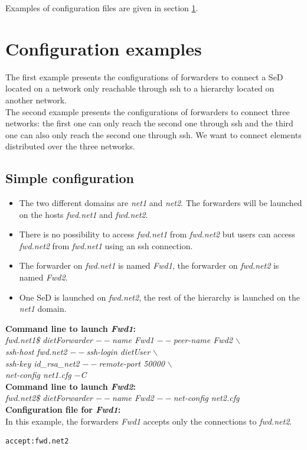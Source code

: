 Examples of configuration files are given in section
\ref{sec:ForwarderExamples}.


\section{Configuration examples}
\label{sec:ForwarderExamples}
The first example presents the configurations of \diet forwarders to
connect a SeD located on a network only reachable through ssh to a
\diet hierarchy located on another network.\\

The second example presents the configurations of \diet forwarders to
connect three networks: the first one can only reach the second one
through ssh and the third one can also only reach the second one
through ssh. We want to connect \diet elements distributed over the
three networks.
\subsection{Simple configuration}
\begin{itemize}
\item The two different domains are \textit{net1} and \textit{net2}. The forwarders will
  be launched on the hosts \textit{fwd.net1} and \textit{fwd.net2}.
\item There is no possibility to access \textit{fwd.net1} from
  \textit{fwd.net2} but users can access \textit{fwd.net2} from
  \textit{fwd.net1} using an ssh connection.
\item The forwarder on \textit{fwd.net1} is named \textit{Fwd1}, the
  forwarder on \textit{fwd.net2} is named \textit{Fwd2}.
\item One SeD is launched on \textit{fwd.net2}, the rest of the \diet
  hierarchy is launched on the \textit{net1} domain.\\
\end{itemize}

\noindent\textbf{Command line to launch \textit{Fwd1}: }\\
{\small \it fwd.net1\$ dietForwarder {\tiny$--$}name Fwd1
  {\tiny$--$}peer-name Fwd2 $\backslash$\\
  \hspace*{4.2cm}{\tiny$--$}ssh-host fwd.net2 {\tiny$--$}ssh-login
  dietUser $\backslash$\\
  \hspace*{4.2cm}{\tiny$--$}ssh-key id\_rsa\_net2
  {\tiny$--$}remote-port 50000 $\backslash$\\
  \hspace*{4.2cm}{\tiny$--$}net-config net1.cfg {\tiny$-$}C}\\[2mm]
\noindent\textbf{Command line to launch \textit{Fwd2}: }\\
{\small \it fwd.net2\$ dietForwarder {\tiny$--$}name Fwd2
  {\tiny$--$}net-config net2.cfg}\\[3mm]
\noindent\textbf{Configuration file for \textit{Fwd1}:}\\
In this example, the forwarders \textit{Fwd1} accepts only the
connections to \textit{fwd.net2}.
\begin{verbatim}
accept:fwd.net2
\end{verbatim}

